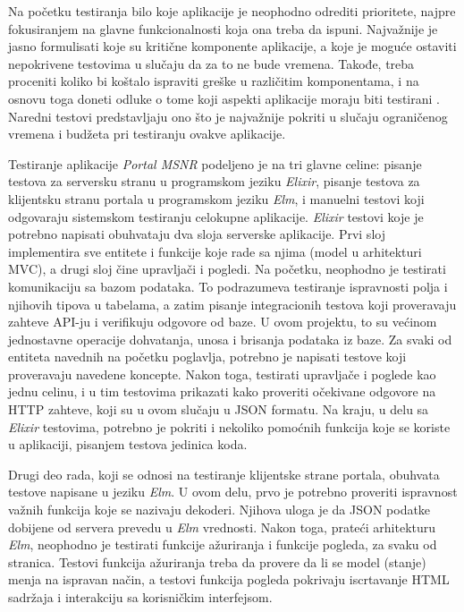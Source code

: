 \documentclass[12pt,oneside]{memoir}
\begin{document}
\par Na početku testiranja bilo koje aplikacije je neophodno odrediti prioritete, najpre fokusiranjem na glavne funkcionalnosti koja ona treba da ispuni. Najvažnije je jasno formulisati koje su kritične komponente aplikacije, a koje je moguće ostaviti nepokrivene testovima u slučaju da za to ne bude vremena. Takođe, treba proceniti koliko bi koštalo ispraviti greške u različitim komponentama, i na osnovu toga doneti odluke o tome koji aspekti aplikacije moraju biti testirani \cite{stlc, est}. Naredni testovi predstavljaju ono što je najvažnije pokriti u slučaju ograničenog vremena i budžeta pri testiranju ovakve aplikacije. 
\par Testiranje aplikacije \emph{Portal MSNR} podeljeno je na tri glavne celine: pisanje testova za serversku stranu u programskom jeziku \emph{Elixir}, pisanje testova za klijentsku stranu portala u programskom jeziku \emph{Elm}, i manuelni testovi koji odgovaraju sistemskom testiranju celokupne aplikacije. \emph{Elixir} testovi koje je potrebno napisati obuhvataju dva sloja serverske aplikacije. Prvi sloj implementira sve entitete i funkcije koje rade sa njima (model u arhitekturi MVC), a drugi sloj čine upravljači i pogledi. Na početku, neophodno je testirati komunikaciju sa bazom podataka. To podrazumeva testiranje ispravnosti polja i njihovih tipova u tabelama, a zatim pisanje integracionih testova koji proveravaju zahteve API-ju i verifikuju odgovore od baze. U ovom projektu, to su većinom jednostavne operacije dohvatanja, unosa i brisanja podataka iz baze. Za svaki od entiteta navednih na početku poglavlja, potrebno je napisati testove koji proveravaju navedene koncepte. Nakon toga, testirati upravljače i poglede kao jednu celinu, i u tim testovima prikazati kako proveriti očekivane odgovore na HTTP zahteve, koji su u ovom slučaju u JSON formatu. Na kraju, u delu sa \emph{Elixir} testovima, potrebno je pokriti i nekoliko pomoćnih funkcija koje se koriste u aplikaciji, pisanjem testova jedinica koda.
\par Drugi deo rada, koji se odnosi na testiranje klijentske strane portala, obuhvata testove napisane u jeziku \emph{Elm}. U ovom delu, prvo je potrebno proveriti ispravnost važnih funkcija koje se nazivaju dekoderi. Njihova uloga je da JSON podatke dobijene od servera prevedu u \emph{Elm} vrednosti. Nakon toga, prateći arhitekturu \emph{Elm}, neophodno je testirati funkcije ažuriranja i funkcije pogleda, za svaku od stranica. Testovi funkcija ažuriranja treba da provere da li se model (stanje) menja na ispravan način, a testovi funkcija pogleda pokrivaju iscrtavanje HTML sadržaja i interakciju sa korisničkim interfejsom.
\end{document}
